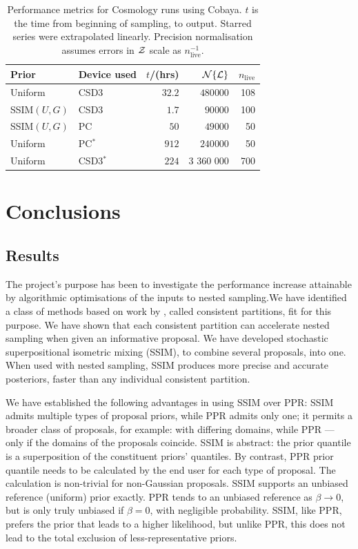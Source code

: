 \documentclass[usenatbib]{mnras}
\begin{document}
\begin{table}
  \centering
  \caption{Performance metrics for Cosmology runs using Cobaya. $t$ is
    the time from beginning of sampling, to output. Starred series
    were extrapolated linearly. Precision normalisation assumes errors in
    ${\cal Z}$ scale as $n_\text{live}^{-1}$. }
  \begin{tabular}{llrrr}
    \textbf{Prior} & \textbf{Device used} & \textbf{$t$/(hrs)} & \({\cal N}\{ {\cal L}\}\) & $n_\text{live}$\\
    \hline
    Uniform & CSD3 &\( 32.2 \) & \(480 000\) & 108\\
    SSIM\((U, G)\) & CSD3 & \(1.7\) & \(90 000\) & 100\\
    SSIM\((U, G)\) & PC & \(50\) & \(49 000\) & 50\\
    \hline
    Uniform & PC$^{*}$ & \(912\) & \(240 000\) & 50\\
    Uniform & CSD3$^{*}$ &  \(224\) & 3 360 000  & 700
  \end{tabular}
  \label{tab:cosmo-performance}
\end{table}

\section{Conclusions}\label{sec:orgdf2cbd9}

\subsection{Results}\label{sec:orgc48c55d}
The project's purpose has been to investigate the performance increase
attainable by algorithmic optimisations of the inputs to nested
sampling.We have identified a class of methods based on work by
\cite{chen-ferroz-hobson}, called consistent partitions, fit for this
purpose. We have shown that each consistent partition can accelerate
nested sampling when given an informative proposal.  We have developed
stochastic superpositional isometric mixing (SSIM), to combine several
proposals, into one. When used with nested sampling, SSIM produces
more precise and accurate posteriors, faster than any individual
consistent partition.

We have established the following advantages in using SSIM over PPR:
SSIM admits multiple types of proposal priors, while PPR admits only
one; it permits a broader class of proposals, for example: with
differing domains, while PPR --- only if the domains of the proposals
coincide.  SSIM is abstract: the prior quantile is a superposition of
the constituent priors' quantiles. By contrast, PPR prior quantile
needs to be calculated by the end user for each type of proposal. The
calculation is non-trivial for non-Gaussian proposals. SSIM supports
an unbiased reference (uniform) prior exactly. PPR tends to an
unbiased reference as \(\beta\rightarrow 0 \), but is only truly
unbiased if $\beta=0$, with negligible probability. SSIM, like PPR,
prefers the prior that leads to a higher likelihood, but unlike PPR,
this does not lead to the total exclusion of less-representative
priors.
\end{document}
